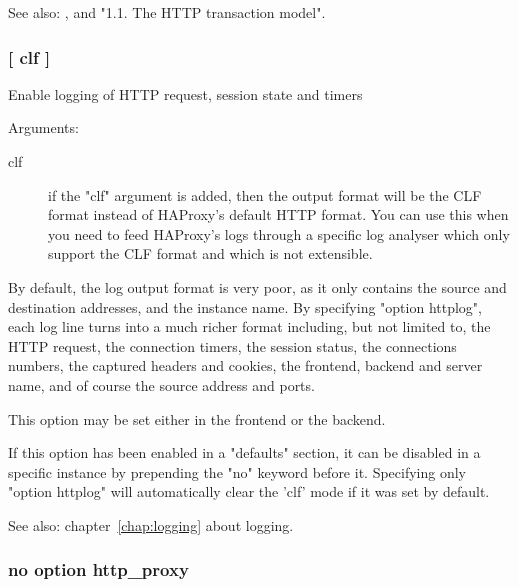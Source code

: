 See also: ,  and
             "1.1. The HTTP transaction model".

\subsubsection[httplog]{ [ clf ]}

  Enable logging of HTTP request, session state and timers


  Arguments:
  
\begin{description}
\item[clf]       if the "clf" argument is added, then the output format will be
              the CLF format instead of HAProxy's default HTTP format. You can
              use this when you need to feed HAProxy's logs through a specific
              log analyser which only support the CLF format and which is not
              extensible.
\end{description}

  By default, the log output format is very poor, as it only contains the
  source and destination addresses, and the instance name. By specifying
  "option httplog", each log line turns into a much richer format including,
  but not limited to, the HTTP request, the connection timers, the session
  status, the connections numbers, the captured headers and cookies, the
  frontend, backend and server name, and of course the source address and
  ports.

  This option may be set either in the frontend or the backend.

  If this option has been enabled in a "defaults" section, it can be disabled
  in a specific instance by prepending the "no" keyword before it. Specifying
  only "option httplog" will automatically clear the 'clf' mode if it was set
  by default.


See also:  chapter~\ref{chap:logging} about logging.

\subsubsection[http\_proxy]{}
\subsubsection*{no option http\_proxy}

